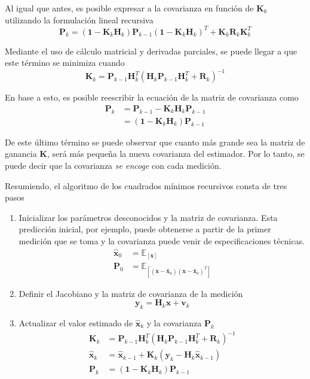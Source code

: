 Al igual que antes, es posible expresar a la covarianza en función de $\bm{K}_k$ utilizando la formulación lineal recursiva
\begin{equation}
    \bm{P}_k = (\bm{1} - \bm{K}_k\bm{H}_k)\bm{P}_{k-1}(\bm{1}-\bm{K}_k\bm{H}_k)^T + \bm{K}_k\bm{R}_k\bm{K}_k^T
\end{equation}

Mediante el uso de cálculo matricial y derivadas parciales, se puede llegar a que este término se minimiza cuando
\begin{equation}
    \bm{K}_k = \bm{P}_{k-1}\bm{H}_k^T(\bm{H}_k\bm{P}_{k-1}\bm{H}_k^T + \bm{R}_k)^{-1}
\end{equation}

En base a esto, es posible reescribir la ecuación de la matriz de covarianza como
\begin{align}
    \bm{P}_k &= \bm{P}_{k-1} - \bm{K}_k\bm{H}_k\bm{P}_{k-1} \\
                 &= (\bm{1} - \bm{K}_k\bm{H}_k)\bm{P}_{k-1}
\end{align}

De este último término se puede observar que cuanto más grande sea la matriz de ganancia $\bm{K}$, será más pequeña la nueva covarianza del estimador. Por lo tanto, se puede decir que la covarianza \textit{se encoge} con cada medición.

Resumiendo, el algoritmo de los cuadrados mínimos recursivos consta de tres pasos
\begin{enumerate}
    \item Inicializar los parámetros desconocidos y la matriz de covarianza. Esta predicción inicial, por ejemplo, puede obtenerse a partir de la primer medición que se toma y la covarianza puede venir de especificaciones técnicas.
        \begin{align}
            \hat{\bm{x}}_0 &= \mathbb{E}_{[\bm{x}]} \\
            \bm{P}_0 &= \mathbb{E}_{[(\bm{x} - \hat{\bm{x}}_0)(\bm{x} - \hat{\bm{x}}_0)^T]}
        \end{align}
    \item Definir el Jacobiano y la matriz de covarianza de la medición
        \begin{equation}
          \bm{y}_k = \bm{H}_k\bm{x}+\bm{v}_k
        \end{equation}
    \item Actualizar el valor estimado de $\hat{\bm{x}}_k$ y la covarianza $\bm{P}_k$
        \begin{align}
            \bm{K}_k &= \bm{P}_{k-1}\bm{H}_k^T(\bm{H}_k\bm{P}_{k-1}\bm{H}_k^T + \bm{R}_k)^{-1} \\
            \hat{\bm{x}}_k &= \hat{\bm{x}}_{k-1} + \bm{K}_k(\bm{y}_k - \bm{H}_k\hat{\bm{x}}_{k-1}) \\
            \bm{P}_k &= (\bm{1} - \bm{K}_k\bm{H}_k)\bm{P}_{k-1}
        \end{align}
\end{enumerate}

